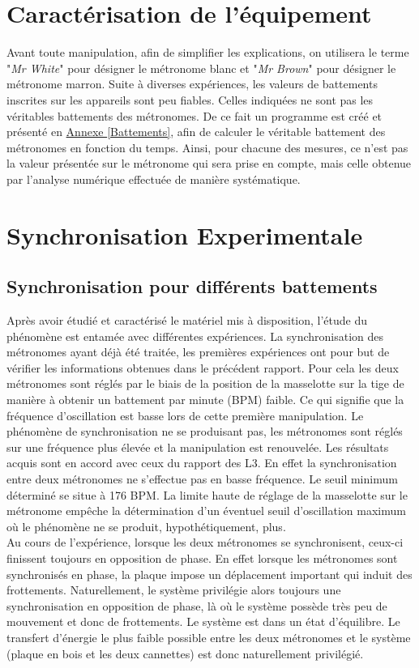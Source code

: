 \documentclass[a4paper,11pt]{report}
\begin{document}
\section{Caractérisation de l'équipement}
Avant toute manipulation, afin de simplifier les explications, on utilisera le terme "{\it Mr White}" pour désigner le métronome blanc et "{\it Mr Brown}" pour désigner le métronome marron. Suite à diverses expériences, les valeurs de battements inscrites sur les appareils sont peu fiables. Celles indiquées ne sont pas les véritables battements des métronomes. De ce fait un programme est créé et présenté en \underline{Annexe \ref{Battements}}, afin de calculer le véritable battement des métronomes en fonction du temps. Ainsi, pour chacune des mesures, ce n'est pas la valeur présentée sur le métronome qui sera prise en compte, mais celle obtenue par l'analyse numérique effectuée de manière systématique.

\section{Synchronisation Experimentale}

\subsection{Synchronisation pour différents battements}
Après avoir étudié et caractérisé le matériel mis à disposition, l'étude du phénomène est entamée avec différentes expériences. La synchronisation des métronomes ayant déjà été traitée, les premières expériences ont pour but de vérifier les informations obtenues dans le précédent rapport. Pour cela les deux métronomes sont réglés par le biais de la position de la masselotte sur la tige de manière à obtenir un battement par minute (BPM) faible. Ce qui signifie que la fréquence d'oscillation est basse lors de cette première manipulation. Le phénomène de synchronisation ne se produisant pas, les métronomes sont réglés sur une fréquence plus élevée et la manipulation est renouvelée. Les résultats acquis sont en accord avec ceux du rapport des L3\cite{ram}. En effet la synchronisation entre deux métronomes ne s'effectue pas en basse fréquence. Le seuil minimum déterminé se situe à 176 BPM. La limite haute de réglage de la masselotte sur le métronome empêche la détermination d'un éventuel seuil d'oscillation maximum où le phénomène ne se produit, hypothétiquement, plus.\\

Au cours de l'expérience, lorsque les deux métronomes se synchronisent, ceux-ci finissent toujours en opposition de phase. En effet lorsque les métronomes sont synchronisés en phase, la plaque impose un  déplacement important qui induit des frottements. Naturellement, le système privilégie alors toujours une synchronisation en opposition de phase, là où le système possède très peu de mouvement et donc de frottements. Le système est dans un état d'équilibre. Le transfert d'énergie le plus faible possible entre les deux métronomes et le système (plaque en bois et les deux cannettes) est donc naturellement privilégié.		
\end{document}
